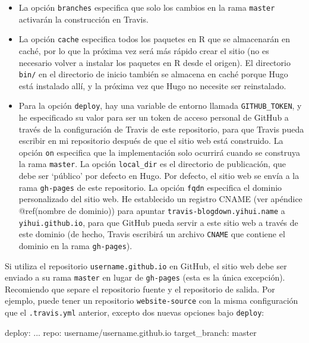\documentclass[12pt,]{krantz}
\makeatletter
\newenvironment{Shaded}{\begin{snugshade}}{\end{snugshade}}
\newcommand{\AttributeTok}[1]{\textcolor[rgb]{0.77,0.63,0.00}{#1}}
\newcommand{\FunctionTok}[1]{\textcolor[rgb]{0.00,0.00,0.00}{#1}}
\newcommand{\NormalTok}[1]{#1}
\newenvironment{kframe}{%
\medskip{}
\setlength{\fboxsep}{.8em}
 \def\at@end@of@kframe{}%
 \ifinner\ifhmode%
  \def\at@end@of@kframe{\end{minipage}}%
  \begin{minipage}{\columnwidth}%
 \fi\fi%
 \def\FrameCommand##1{\hskip\@totalleftmargin \hskip-\fboxsep
 \colorbox{shadecolor}{##1}\hskip-\fboxsep
     \hskip-\linewidth \hskip-\@totalleftmargin \hskip\columnwidth}%
 \MakeFramed {\advance\hsize-\width
   \@totalleftmargin\z@ \linewidth\hsize
   \@setminipage}}%
 {\par\unskip\endMakeFramed%
 \at@end@of@kframe}
\renewenvironment{Shaded}{\begin{kframe}}{\end{kframe}}
\theoremstyle{definition}
\theoremstyle{definition}
\theoremstyle{definition}
\theoremstyle{remark}
\makeatother
\begin{document}
\begin{itemize}
\item
  La opción \texttt{branches} especifica que solo los cambios en la rama
  \texttt{master} activarán la construcción en Travis.
\item
  La opción \texttt{cache} especifica todos los paquetes en R que se
  almacenarán en caché, por lo que la próxima vez será más rápido crear
  el sitio (no es necesario volver a instalar los paquetes en R desde el
  origen). El directorio \texttt{bin/} en el directorio de inicio
  también se almacena en caché porque Hugo está instalado allí, y la
  próxima vez que Hugo no necesite ser reinstalado.
\item
  Para la opción \texttt{deploy}, hay una variable de entorno llamada
  \texttt{GITHUB\_TOKEN}, y he especificado su valor para ser un token
  de acceso personal de GitHub a través de la configuración de Travis de
  este repositorio, para que Travis pueda escribir en mi repositorio
  después de que el sitio web está construido. La opción \texttt{on}
  especifica que la implementación solo ocurrirá cuando se construya la
  rama \texttt{master}. La opción \texttt{local\_dir} es el directorio
  de publicación, que debe ser `público' por defecto en Hugo. Por
  defecto, el sitio web se envía a la rama \texttt{gh-pages} de este
  repositorio. La opción \texttt{fqdn} especifica el dominio
  personalizado del sitio web. He establecido un registro CNAME (ver
  apéndice @ref(nombre de dominio)) para apuntar
  \texttt{travis-blogdown.yihui.name} a \texttt{yihui.github.io}, para
  que GitHub pueda servir a este sitio web a través de este dominio (de
  hecho, Travis escribirá un archivo \texttt{CNAME} que contiene el
  dominio en la rama \texttt{gh-pages}).
\end{itemize}

Si utiliza el repositorio \texttt{username.github.io} en GitHub, el
sitio web debe ser enviado a su rama \texttt{master} en lugar de
\texttt{gh-pages} (esta es la única excepción). Recomiendo que separe el
repositorio fuente y el repositorio de salida. Por ejemplo, puede tener
un repositorio \texttt{website-source} con la misma configuración que el
\texttt{.travis.yml} anterior, excepto dos nuevas opciones bajo
\texttt{deploy}:

\begin{Shaded}
\begin{Highlighting}[]
\FunctionTok{deploy:}
\NormalTok{  ...}
  \FunctionTok{repo:}\AttributeTok{ username/username.github.io}
  \FunctionTok{target_branch:}\AttributeTok{ master}
\end{Highlighting}
\end{Shaded}
\end{document}
